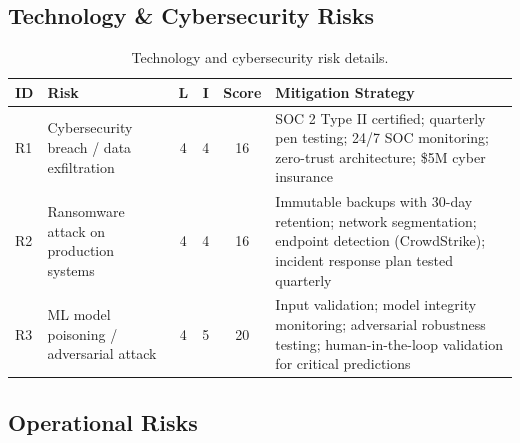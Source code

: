 \documentclass[
    language=english,
    doctype=risk-assessment,
    institution=none,
]{../../omnilatex}
\begin{document}
\subsection{Technology \& Cybersecurity Risks}

\begin{table}[h]
    \centering
    \small
    \begin{tabular}{llcccl}
        \toprule
        \textbf{ID} & \textbf{Risk} & \textbf{L} & \textbf{I} & \textbf{Score} & \textbf{Mitigation Strategy} \\
        \midrule
        R1 & Cybersecurity breach / data exfiltration & 4 & 4 & 16 &
            SOC 2 Type II certified; quarterly pen testing; 24/7 SOC
            monitoring; zero-trust architecture; \$5M cyber insurance \\
        R2 & Ransomware attack on production systems & 4 & 4 & 16 &
            Immutable backups with 30-day retention; network segmentation;
            endpoint detection (CrowdStrike); incident response plan tested
            quarterly \\
        R3 & ML model poisoning / adversarial attack & 4 & 5 & 20 &
            Input validation; model integrity monitoring; adversarial
            robustness testing; human-in-the-loop validation for critical
            predictions \\
        \bottomrule
    \end{tabular}
    \caption{Technology and cybersecurity risk details.}
\end{table}

\subsection{Operational Risks}
\end{document}
